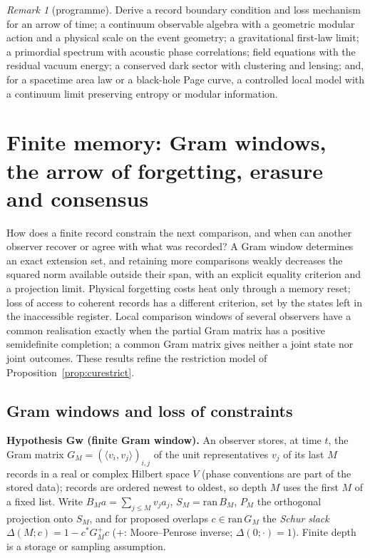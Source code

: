 \documentclass[aps,pra,onecolumn,superscriptaddress,nofootinbib,10pt]{revtex4-2}
\theoremstyle{definition}
\theoremstyle{remark}
\newtheorem{remark}[theorem]{Remark}
\newcommand{\ip}[2]{\langle #1,#2\rangle}
\begin{document}
\begin{remark}[programme]\label{rem:cuprogramme}
Derive a record boundary condition and loss mechanism for an arrow of time; a continuum observable
algebra with a geometric modular action and a physical scale on the event geometry; a gravitational
first-law limit; a primordial spectrum with acoustic phase correlations; field equations with the
residual vacuum energy; a conserved dark sector with clustering and lensing; and, for a spacetime area
law or a black-hole Page curve, a controlled local model with a continuum limit preserving entropy or
modular information.
\end{remark}


\section{Finite memory: Gram windows, the arrow of forgetting, erasure and consensus}\label{sec:finitemem}
How does a finite record constrain the next comparison, and when can another observer recover or agree
with what was recorded?  A Gram window determines an exact extension set, and retaining more comparisons
weakly decreases the squared norm available outside their span, with an explicit equality criterion and a
projection limit.  Physical forgetting costs heat only through a memory reset; loss of access to coherent
records has a different criterion, set by the states left in the inaccessible register.  Local
comparison windows of several observers have a common realisation exactly when the partial Gram matrix
has a positive semidefinite completion; a common Gram matrix gives neither a joint state nor joint
outcomes.  These results refine the restriction model of Proposition~\ref{prop:curestrict}.

\subsection{Gram windows and loss of constraints}\label{sec:fmwindows}

\smallskip\noindent\textbf{Hypothesis Gw (finite Gram window).}  An observer stores, at time $t$, the Gram matrix
$G_M=(\ip{v_i}{v_j})_{i,j}$ of the unit representatives $v_j$ of its last $M$ records in a real or complex Hilbert space $V$
(phase conventions are part of the stored data); records are ordered newest to oldest, so depth $M$ uses the
first $M$ of a fixed list.  Write $B_Ma=\sum_{j\le M}v_ja_j$, $S_M=\mathrm{ran}\,B_M$, $P_M$ the orthogonal projection onto $S_M$, and for
proposed overlaps $c\in\mathrm{ran}\,G_M$ the \emph{Schur slack} $\Delta(M;c)=1-c^*G_M^+c$ ($+$: Moore--Penrose inverse; $\Delta(0;\cdot)=1$).  Finite
depth is a storage or sampling assumption.
\end{document}
